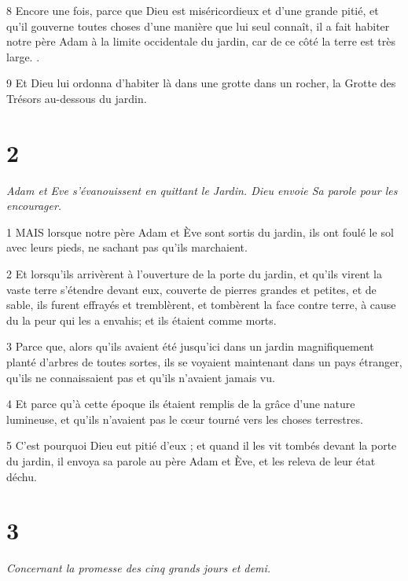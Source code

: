 \par 8 Encore une fois, parce que Dieu est miséricordieux et d'une grande pitié, et qu'il gouverne toutes choses d'une manière que lui seul connaît, il a fait habiter notre père Adam à la limite occidentale du jardin, car de ce côté la terre est très large. .

\par 9 Et Dieu lui ordonna d'habiter là dans une grotte dans un rocher, la Grotte des Trésors au-dessous du jardin.

\chapter{2}

\par \textit{Adam et Eve s'évanouissent en quittant le Jardin. Dieu envoie Sa parole pour les encourager.}

\par 1 MAIS lorsque notre père Adam et Ève sont sortis du jardin, ils ont foulé le sol avec leurs pieds, ne sachant pas qu'ils marchaient.

\par 2 Et lorsqu'ils arrivèrent à l'ouverture de la porte du jardin, et qu'ils virent la vaste terre s'étendre devant eux, couverte de pierres grandes et petites, et de sable, ils furent effrayés et tremblèrent, et tombèrent la face contre terre, à cause du la peur qui les a envahis; et ils étaient comme morts.

\par 3 Parce que, alors qu'ils avaient été jusqu'ici dans un jardin magnifiquement planté d'arbres de toutes sortes, ils se voyaient maintenant dans un pays étranger, qu'ils ne connaissaient pas et qu'ils n'avaient jamais vu.

\par 4 Et parce qu'à cette époque ils étaient remplis de la grâce d'une nature lumineuse, et qu'ils n'avaient pas le cœur tourné vers les choses terrestres.

\par 5 C'est pourquoi Dieu eut pitié d'eux ; et quand il les vit tombés devant la porte du jardin, il envoya sa parole au père Adam et Ève, et les releva de leur état déchu.

\chapter{3}

\par \textit{Concernant la promesse des cinq grands jours et demi.}


